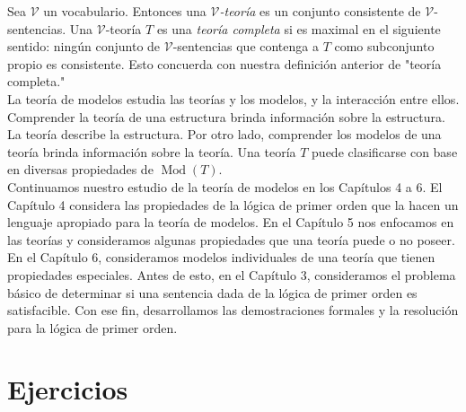 \message{ !name(main.tex)}\documentclass[12pt,a4paper]{book}
\newcommand{\comillas}[1]{"#1"}
\newcommand{\VV}{\mathcal{V}}
\DeclareMathOperator{\Mod}{Mod}
\begin{document}
    Sea $\VV$ un vocabulario. Entonces una \textit{$\VV$-teoría} es un conjunto consistente de $\VV$-sentencias. Una
    $\VV$-teoría $T$ es una \textit{teoría completa} si es maximal en el siguiente sentido: ningún conjunto de
    $\VV$-sentencias que contenga a $T$ como subconjunto propio es consistente. Esto concuerda con nuestra definición
    anterior de \comillas{teoría completa.}\\
    La teoría de modelos estudia las teorías y los modelos, y la interacción entre ellos. Comprender la teoría de una
    estructura brinda información sobre la estructura. La teoría describe la estructura. Por otro lado, comprender los
    modelos de una teoría brinda información sobre la teoría. Una teoría $T$ puede clasificarse con base en diversas
    propiedades de $\Mod(T)$.\\
    Continuamos nuestro estudio de la teoría de modelos en los Capítulos 4 a 6. El Capítulo 4 considera las propiedades de
    la lógica de primer orden que la hacen un lenguaje apropiado para la teoría de modelos. En el Capítulo 5 nos
    enfocamos en las teorías y consideramos algunas propiedades que una teoría puede o no poseer. En el Capítulo 6,
    consideramos modelos individuales de una teoría que tienen propiedades especiales. Antes de esto, en el Capítulo 3,
    consideramos el problema básico de determinar si una sentencia dada de la lógica de primer orden es satisfacible.
    Con ese fin, desarrollamos las demostraciones formales y la resolución para la lógica de primer orden.

    \section*{Ejercicios}
\end{document}
